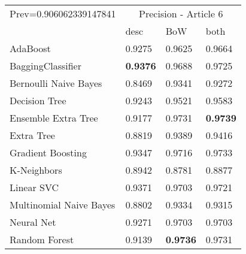 \begin{tabular}{|l|l|l|l| }
\hline
Prev=0.906062339147841 &  \multicolumn{3}{c|}{Precision - Article 6} \\
\cline{2-4} & desc & BoW & both \\ \hline
AdaBoost                & 0.9275 & 0.9625 & 0.9664\\
BaggingClassifier       & {\bf 0.9376} & 0.9688 & 0.9725\\
Bernoulli Naive Bayes   & 0.8469 & 0.9341 & 0.9272\\
Decision Tree           & 0.9243 & 0.9521 & 0.9583\\
Ensemble Extra Tree     & 0.9177 & 0.9731 & {\bf 0.9739}\\
Extra Tree              & 0.8819 & 0.9389 & 0.9416\\
Gradient Boosting       & 0.9347 & 0.9716 & 0.9733\\
K-Neighbors             & 0.8942 & 0.8781 & 0.8877\\
Linear SVC              & 0.9371 & 0.9703 & 0.9721\\
Multinomial Naive Bayes & 0.8802 & 0.9334 & 0.9315\\
Neural Net              & 0.9271 & 0.9703 & 0.9703\\
Random Forest           & 0.9139 & {\bf 0.9736} & 0.9731\\
\hline
\end{tabular}